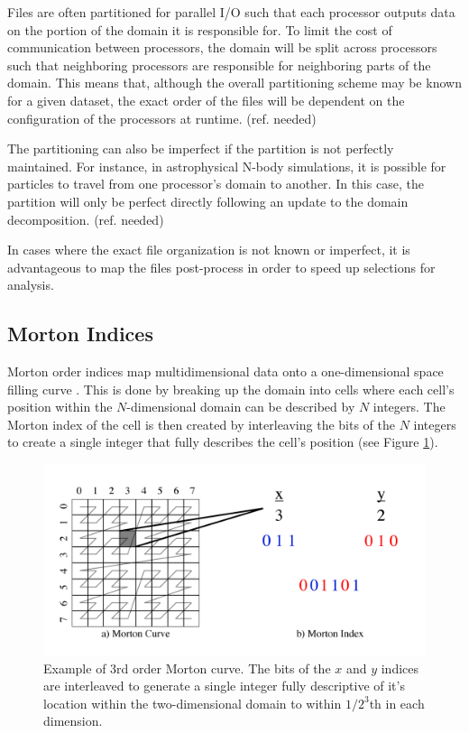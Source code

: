 \documentclass[apjl]{emulateapj}
\newcommand{\addref}{{\color{red}(ref. needed)}}
\begin{document}
Files are often partitioned for parallel I/O such that each processor outputs data on the portion of the domain it is responsible for. To limit the cost of communication between processors, the domain will be split across processors such that neighboring processors are responsible for neighboring parts of the domain. This means that, although the overall partitioning scheme may be known for a given dataset, the exact order of the files will be dependent on the configuration of the processors at runtime. \addref

The partitioning can also be imperfect if the partition is not perfectly maintained. For instance, in astrophysical N-body simulations, it is possible for particles to travel from one processor's domain to another. In this case, the partition will only be perfect directly following an update to the domain decomposition. \addref

In cases where the exact file organization is not known or imperfect, it is advantageous to map the files post-process in order to speed up selections for analysis. 

\subsection{Morton Indices}
Morton order indices map multidimensional data onto a one-dimensional space filling curve \citep{Morton1996}. This is done by breaking up the domain into cells where each cell's position within the $N$-dimensional domain can be described by $N$ integers. The Morton index of the cell is then created by interleaving the bits of the $N$ integers to create a single integer that fully describes the cell's position (see Figure \ref{fig:zorder}). 
%
\begin{figure}[htbp]
\begin{center}
\includegraphics[width=0.75\columnwidth,keepaspectratio]{../images/zorder.png}
\caption{Example of 3rd order Morton curve. The bits of the $x$ and $y$ indices are interleaved to generate a single integer fully descriptive of it's location within the two-dimensional domain to within $1/2^{3}$th in each dimension.}
\label{fig:zorder}
\end{center}
\end{figure}
%
\end{document}

